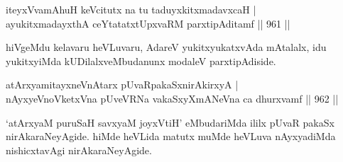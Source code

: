 \begin{shl}
iteyxVvamAhuH keVcitutx na tu taduyxkitxmadavxcaH | \\
ayukitxmadayxthA ceYtatatxtUpxvaRM parxtipAditamf \hfill||  961 ||  
\end{shl}

\begin{artha}
hiVgeMdu kelavaru heVLuvaru, AdareV yukitxyukatxvAda mAtalalx, idu yukitxyiMda kUDilalxveMbudanunx modaleV parxtipAdiside.
\end{artha}


\begin{shl}
atArxyamitayxneVnAtarx pUvaRpakaSxnirAkirxyA | \\
nAyxyeVnoVketxVna pUveVRNa vakaSxyXmANeVna ca dhurxvamf \hfill||  962 ||  
\end{shl}

\begin{artha}
`atArxyaM puruSaH savxyaM joyxVtiH' eMbudariMda ililx pUvaR pakaSx nirAkaraNeyAgide. hiMde heVLida matutx muMde heVLuva nAyxyadiMda nishicxtavAgi nirAkaraNeyAgide.
\end{artha}
